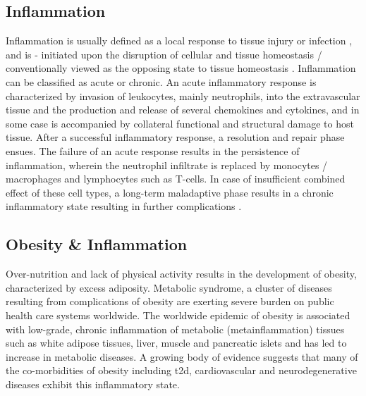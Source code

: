 




    

\subsection{Inflammation}
\label{sec:immune_inflammation}

\par Inflammation is usually defined as a local response to tissue injury or infection \textbf{\cite{donath_islet_2008}}, and is - initiated upon the disruption of cellular and tissue homeostasis / conventionally viewed as the opposing state to tissue homeostasis \textbf{\cite{meizlish_tissue_2021}}. Inflammation can be classified as acute or chronic. An acute inflammatory response is characterized by invasion of leukocytes, mainly neutrophils, into the extravascular tissue and the production and release of several chemokines and cytokines, and in some case is accompanied by collateral functional and structural damage to host tissue. After a successful inflammatory response, a resolution and repair phase ensues. The failure of an acute response results in the persistence of inflammation, wherein the neutrophil infiltrate is replaced by monocytes / macrophages and lymphocytes such as T-cells. In case of insufficient combined effect of these cell types, a long-term maladaptive phase results in a chronic inflammatory state resulting in further complications \textbf{\cite{medzhitov_origin_2008}}. 

\subsection{Obesity \& Inflammation}
\label{sec:immune_obesity}

Over-nutrition and lack of physical activity results in the development of obesity, characterized by excess adiposity. Metabolic syndrome, a cluster of diseases resulting from complications of obesity are exerting severe burden on public health care systems worldwide. The worldwide epidemic of obesity is associated with low-grade, chronic inflammation of metabolic (metainflammation) tissues such as white adipose tissues, liver, muscle and pancreatic islets and has led to increase in metabolic diseases. A growing body of evidence suggests that many of the co-morbidities of obesity including \gls{t2d}, cardiovascular and neurodegenerative diseases exhibit this inflammatory state.\\

